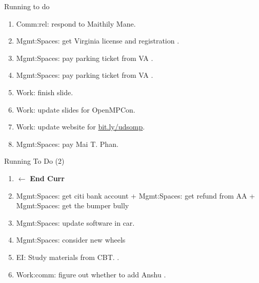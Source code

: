 \begin{frame}{Running to do}
\begin{enumerate}
\item \tiny Comm:rel: respond to Maithily Mane. 
\item \tiny Mgmt:Spaces: get Virginia license and registration .
\item \tiny Mgmt:Spaces: pay parking ticket from VA  . 
\item \tiny Mgmt:Spaces: pay parking ticket from VA  .
\item \tiny Work: finish slide. 

\item \tiny Work: update slides for OpenMPCon. 
\item \tiny Work: update website for  \url{bit.ly/udsomp}. 
\item \tiny Mgmt:Spaces: pay Mai T. Phan. 
  \seti
\end{enumerate}

\end{frame}
  
\begin{frame}{Running To Do (2)} 
  \begin{enumerate}
    \conti    
  \item[] \tiny  $\leftarrow$ \textbf{End Curr}
  \item \tiny Mgmt:Spaces: get citi bank account + Mgmt:Spaces: get refund from AA  + Mgmt:Spaces: get the bumper bully 
  \item \tiny Mgmt:Spaces: update software  in car. 
  \item \tiny  Mgmt:Spaces: consider new wheels 
  \item \tiny EI: Study materials from CBT.   .
  \item \tiny Work:comm: figure out whether to add Anshu .
  \end{enumerate}
  
 \end{frame}

